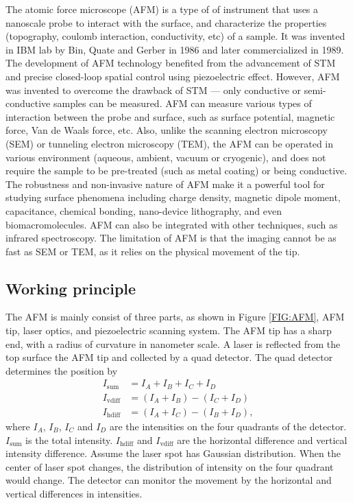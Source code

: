 \documentclass[pdflatex, sectionletters, 12pt]{pittetd}    %
\begin{document}
The atomic force microscope (AFM) is a type of of instrument that uses a nanoscale probe to interact with the surface, and characterize the properties (topography, coulomb interaction, conductivity, etc) of a sample. It was invented in IBM lab by Bin, Quate and Gerber \cite{} in 1986 and later commercialized in 1989. The development of AFM technology benefited from the advancement of STM and precise closed-loop spatial control using piezoelectric effect. However, AFM was invented to overcome the drawback of STM --- only conductive or semi-conductive samples can be measured. AFM can measure various types of interaction between the probe and surface, such as surface potential, magnetic force, Van de Waals force, etc. Also, unlike the scanning electron microscopy (SEM) or tunneling electron microscopy (TEM), the AFM can be operated in various environment (aqueous, ambient, vacuum or cryogenic), and does not require the sample to be pre-treated (such as metal coating) or being conductive. The robustness and non-invasive nature of AFM make it a powerful tool for studying surface phenomena including charge density, magnetic dipole moment, capacitance, chemical bonding, nano-device lithography, and even biomacromolecules. AFM can also be integrated with other techniques, such as infrared spectroscopy\cite{}. The limitation of AFM is that the imaging cannot be as fast as SEM or TEM, as it relies on the physical movement of the tip.

\subsection{Working principle}


The AFM is mainly consist of three parts, as shown in Figure \ref{FIG:AFM}, AFM tip, laser optics, and piezoelectric scanning system. The AFM tip has a sharp end, with a radius of curvature in nanometer scale. A laser is reflected from the top surface the AFM tip and collected by a quad detector. The quad detector determines the position by
\begin{equation}
\begin{split}
I_\mathrm{sum} & = I_A + I_B + I_C + I_D \\ 
I_\mathrm{vdiff} & = (I_A + I_B) - (I_C + I_D) \\ 
I_\mathrm{hdiff} & = (I_A + I_C) - (I_B + I_D),
\end{split}
\end{equation}
where $I_A$, $I_B$, $I_C$ and $I_D$ are the intensities on the four quadrants of the detector. $I_\mathrm{sum}$ is the total intensity. $I_\mathrm{hdiff}$ and $I_\mathrm{vdiff}$ are the horizontal difference and vertical intensity difference. Assume the laser spot has Gaussian distribution. When the center of laser spot changes, the distribution of intensity on the four quadrant would change. The detector can monitor the movement by the horizontal and vertical differences in intensities. 
\end{document}
